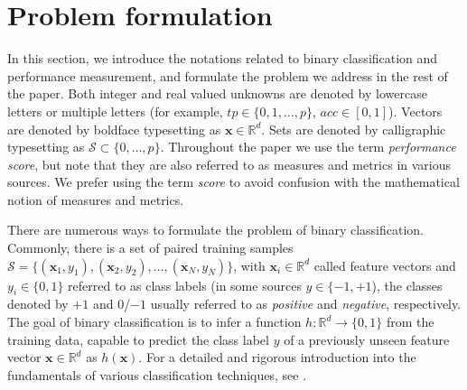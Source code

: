 \documentclass[5p, final]{elsarticle}
\begin{document}




\section{Problem formulation}
\label{sec:problem}

In this section, we introduce the notations related to binary classification and performance measurement, and formulate the problem we address in the rest of the paper. Both integer and real valued unknowns are denoted by lowercase letters or multiple letters (for example, $tp\in \lbrace 0, 1, \dots, p\rbrace$, $acc\in [0, 1]$). Vectors are denoted by boldface typesetting as $\mathbf{x}\in\mathbb{R}^{d}$. Sets are denoted by calligraphic typesetting as $\mathcal{S}\subset\lbrace 0, \dots, p\rbrace$. Throughout the paper we use the term \emph{performance score}, but note that they are also referred to as measures and metrics in various sources. We prefer using the term \emph{score} to avoid confusion with the mathematical notion of measures and metrics.

There are numerous ways to formulate the problem of binary classification. Commonly, there is a set of paired training samples $\mathcal{S} = \lbrace(\mathbf{x}_1, y_1), (\mathbf{x}_2, y_2), \dots, (\mathbf{x}_N, y_N)\rbrace$, with $\mathbf{x}_i\in\mathbb{R}^d$ called feature vectors and $y_i\in\lbrace 0, 1\rbrace$ referred to as class labels (in some sources $y\in\lbrace{-1, +1}$), the classes denoted by $+1$ and $0$/$-1$ usually referred to as \emph{positive} and \emph{negative}, respectively. 
The goal of binary classification is to infer a function $h: \mathbb{R}^d\rightarrow \lbrace 0, 1\rbrace$ from the training data, capable to predict the class label $y$ of a previously unseen feature vector $\mathbf{x}\in\mathbb{R}^d$ as $h(\mathbf{x})$. For a detailed and rigorous introduction into the fundamentals of various classification techniques, see \cite{mlbook, mlbook2}. 
\end{document}
